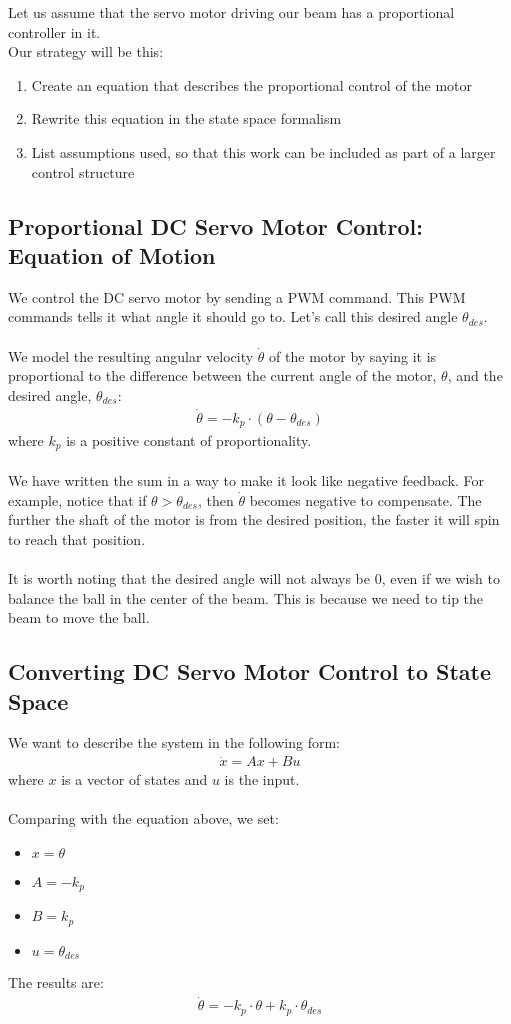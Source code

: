 \documentclass[a4paper]{article}
\begin{document}
Let us assume that the servo motor driving our beam has a proportional controller in it.\\
Our strategy will be this:
\begin{enumerate}
\item Create an equation that describes the proportional control of the motor
\item Rewrite this equation in the state space formalism
\item List assumptions used, so that this work can be included as part of a larger control structure
\end{enumerate}
\subsection*{Proportional DC Servo Motor Control: Equation of Motion}
We control the DC servo motor by sending a PWM command. This PWM commands tells it what angle it should go to. Let's call this desired angle $\theta_{des}$.
\\\\
We model the resulting angular velocity $ \dot{\theta}$ of the motor by saying it is proportional to the difference between the current angle of the motor, $\theta$, and the desired angle, $\theta_{des}$:
\begin{align*}
 \dot{\theta} = -k_p \cdot (\theta-\theta_{des})
\end{align*}
where $k_p$ is a positive constant of proportionality.
\\\\
We have written the sum in a way to make it look like negative feedback. For example, notice that if $\theta > \theta_{des}$, then $ \dot{\theta}$ becomes negative to compensate. The further the shaft of the motor is from the desired position, the faster it will spin to reach that position.
\\\\
It is worth noting that the desired angle will not always be 0, even if we wish to balance the ball in the center of the beam. This is because we need to tip the beam to move the ball.
\subsection*{Converting DC Servo Motor Control to State Space}
We want to describe the system in the following form:
\begin{align*}
\dot{x} = Ax + Bu
\end{align*}
where $x$ is a vector of states and $u$ is the input.
\\\\
Comparing with the equation above, we set:
\begin{itemize}
\item $x = \theta$
\item $A = -k_p$
\item $B = k_p$
\item $u = \theta_{des}$
\end{itemize}
The results are:
\begin{align*}
\dot{\theta} = -k_p \cdot \theta + k_p \cdot \theta_{des}
\end{align*}
\end{document}
